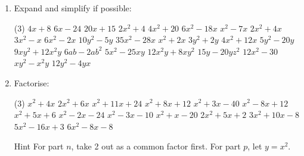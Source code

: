 \documentclass[fleqn]{article}
\begin{document}
\exercise{}
\begin{enumerate}
    \item Expand and simplify if possible:
        \begin{tasks}(3) %
              \task $4x+8$            %
              \task $6x-24$           %
              \task $20x+15$          %
              \task $2x^2+4$          %
              \task $4x^2+20$         %
              \task $6x^2-18x$        %
              \task $x^2-7x$          %
              \task $2x^2+4x$         %
              \task $3x^2-x$          %
              \task $6x^2-2x$         %
              \task $10y^2-5y$        %
              \task $35x^2-28x$       %
              \task $x^2+2x$          %
              \task $3y^2+2y$         %
              \task $4x^2+12x$        %
              \task $5y^2-20y$        %
              \task $9xy^2+12x^2y$    %
              \task $6ab-2ab^2$       %
              \task $5x^2-25xy$       %
              \task $12x^2y+8xy^2$    %
              \task $15y-20yz^2$      %
              \task $12x^2-30$        %
              \task $xy^2-x^2y$       %
              \task $12y^2-4yx$       %
        \end{tasks}
        \newpage
    \item Factorise:
        \begin{tasks}(3) %
            \task $x^2+4x$           %
            \task $2x^2+6x$          %
            \task $x^2+11x+24$       %
            \task $x^2+8x+12$        %
            \task $x^2+3x-40$        %
            \task $x^2-8x+12$        %
            \task $x^2+5x+6$         %
            \task $x^2-2x-24$        %
            \task $x^2-3x-10$        %
            \task $x^2+x-20$         %
            \task $2x^2+5x+2$        %
            \task $3x^2+10x-8$       %
            \task $5x^2-16x+3$       %
            \task $6x^2-8x-8$        %
            \task[]
                \hspace*{-2.25cm}
                \begin{minipage}[t][][c]{0.42\textwidth}
                \vspace{-0.3cm}
                \begin{note*}{Hint}{}
                     For part $n$, take 2 out as a common factor first. For part $p$, let $y=x^2$.
                 \end{note*}

\end{minipage}
\end{tasks}
\end{enumerate}
\end{document}

